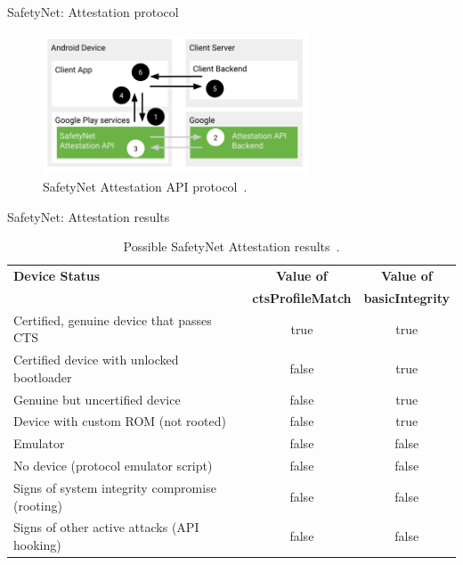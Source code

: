 \documentclass[
    11pt,%
    aspectratio=169,%
]{beamer}
\begin{document}
\begin{frame}{SafetyNet: Attestation protocol}
\begin{figure}
	\centering
	\includegraphics[width=0.7\textwidth]{img/safetynet_attestation}
	\caption{SafetyNet Attestation API protocol~\cite{safetynet_attestation}.}
	\label{fig:safetynet_attestation}
\end{figure}
\end{frame}




\begin{frame}{SafetyNet: Attestation results}
\begin{table}
  \begin{tabular}{l | c | c }

      \textbf{Device Status} & \textbf{Value of} &  \textbf{Value of}\\
       & \textbf{ctsProfileMatch} & \textbf{basicIntegrity}\\
      \hline
       Certified, genuine device that passes CTS & true &true\\
       Certified device with unlocked bootloader&false&true\\
       Genuine but uncertified device &false&true\\
       Device with custom ROM (not rooted)&false&true\\
       Emulator&false &false \\
       No device (protocol emulator script) &false &false \\
       Signs of system integrity compromise (rooting) &false &false \\
       Signs of other active attacks (API hooking) &false &false \\

  \end{tabular}
  \caption{Possible SafetyNet Attestation results~\cite{safetynet_attestation}.}
  \label{table:safetynet_attestation_results}
\end{table}
\end{frame}
\end{document}
